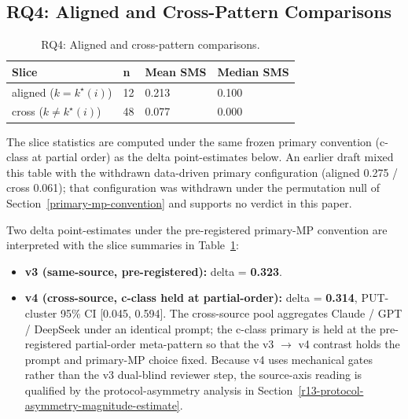 \documentclass[review,12pt,authoryear]{elsarticle}
\providecommand{\tightlist}{\setlength{\itemsep}{0pt}\setlength{\parskip}{0pt}}
\begin{document}
\subsection{RQ4: Aligned and Cross-Pattern Comparisons}\label{rq2-aligned-vs-cross-cliffs-delta}

{\def\LTcaptype{table} %
\begin{longtable}[]{@{}llll@{}}
\caption{RQ4: Aligned and cross-pattern comparisons.}\label{tab:p2-09}\\
\toprule\noalign{}
Slice & n & Mean SMS & Median SMS \\
\midrule\noalign{}
\endhead
\bottomrule\noalign{}
\endlastfoot
aligned ($k = k^\star(i)$) & 12 & 0.213 & 0.100 \\
cross ($k \neq k^\star(i)$) & 48 & 0.077 & 0.000 \\
\end{longtable}
}

The slice statistics are computed under the same frozen primary
convention (c-class at partial order) as the delta point-estimates
below. An earlier draft mixed this table with the withdrawn data-driven
primary configuration (aligned 0.275 / cross 0.061); that configuration
was withdrawn under the permutation null of
Section~\ref{primary-mp-convention} and supports no verdict in this
paper.

Two delta point-estimates under the pre-registered primary-MP
convention are interpreted with the slice summaries in
Table~\ref{tab:p2-09}:

\begin{itemize}
\tightlist
\item
  \textbf{v3 (same-source, pre-registered):} delta = \textbf{0.323}.
\item
  \textbf{v4 (cross-source, c-class held at partial-order):} delta =
  \textbf{0.314}, PUT-cluster 95\% CI [0.045, 0.594]. The cross-source pool
  aggregates Claude / GPT / DeepSeek under an identical prompt; the
  c-class primary is held at the pre-registered partial-order
  meta-pattern so that the v3 $\to$ v4
  contrast holds the prompt and primary-MP choice fixed. Because v4 uses
  mechanical gates rather than the v3 dual-blind reviewer step, the
  source-axis reading is qualified by the protocol-asymmetry analysis in
  Section~\ref{r13-protocol-asymmetry-magnitude-estimate}.
\end{itemize}
\end{document}
